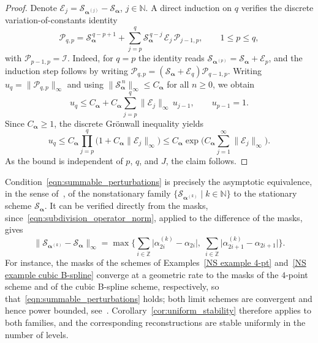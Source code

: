 \documentclass[11pt,a4paper]{article}
\newcommand{\N}{\mathbb{N}}
\theoremstyle{definition}
\begin{document}
\begin{proof}
    Denote $\mathcal{E}_j=\mathcal{S}_{\boldsymbol{\alpha}^{(j)}}-\mathcal{S}_{\boldsymbol{\alpha}}$, $j\in\N$. A direct induction on $q$ verifies the discrete variation-of-constants identity
    \begin{equation*}
        \mathcal{P}_{q,p}=\mathcal{S}_{\boldsymbol{\alpha}}^{\,q-p+1}+\sum_{j=p}^{q}\mathcal{S}_{\boldsymbol{\alpha}}^{\,q-j}\,\mathcal{E}_j\,\mathcal{P}_{j-1,p}, \qquad 1\leq p\leq q,
    \end{equation*}
    with $\mathcal{P}_{p-1,p}=\mathcal{I}$. Indeed, for $q=p$ the identity reads $\mathcal{S}_{\boldsymbol{\alpha}^{(p)}}=\mathcal{S}_{\boldsymbol{\alpha}}+\mathcal{E}_p$, and the induction step follows by writing $\mathcal{P}_{q,p}=(\mathcal{S}_{\boldsymbol{\alpha}}+\mathcal{E}_q)\mathcal{P}_{q-1,p}$. Writing $u_q=\|\mathcal{P}_{q,p}\|_\infty$ and using $\|\mathcal{S}_{\boldsymbol{\alpha}}^{\,n}\|_\infty\leq C_{\boldsymbol{\alpha}}$ for all $n\geq0$, we obtain
    \begin{equation*}
        u_q\leq C_{\boldsymbol{\alpha}}+C_{\boldsymbol{\alpha}}\sum_{j=p}^{q}\|\mathcal{E}_j\|_\infty\, u_{j-1}, \qquad u_{p-1}=1.
    \end{equation*}
    Since $C_{\boldsymbol{\alpha}}\geq1$, the discrete Gr\"onwall inequality yields
    \begin{equation*}
        u_q\leq C_{\boldsymbol{\alpha}}\prod_{j=p}^{q}\big(1+C_{\boldsymbol{\alpha}}\|\mathcal{E}_j\|_\infty\big)\leq C_{\boldsymbol{\alpha}}\exp\bigg(C_{\boldsymbol{\alpha}}\sum_{j=1}^{\infty}\|\mathcal{E}_j\|_\infty\bigg).
    \end{equation*}
    As the bound is independent of $p$, $q$, and $J$, the claim follows.
\end{proof}

Condition~\eqref{eqn:summable_perturbations} is precisely the asymptotic equivalence, in the sense of~\cite{dyn1995analysis}, of the nonstationary family $\{\mathcal{S}_{\boldsymbol{\alpha}^{(k)}} \mid k\in\N\}$ to the stationary scheme $\mathcal{S}_{\boldsymbol{\alpha}}$. It can be verified directly from the masks, since~\eqref{eqn:subdivision_operator_norm}, applied to the difference of the masks, gives
\begin{equation*}
    \big\|\mathcal{S}_{\boldsymbol{\alpha}^{(k)}}-\mathcal{S}_{\boldsymbol{\alpha}}\big\|_\infty=\max\bigg\{\sum_{i\in\mathbb{Z}}\big|\alpha^{(k)}_{2i}-\alpha_{2i}\big|,\; \sum_{i\in\mathbb{Z}}\big|\alpha^{(k)}_{2i+1}-\alpha_{2i+1}\big|\bigg\}.
\end{equation*}
For instance, the masks of the schemes of Examples~\ref{NS example 4-pt} and~\ref{NS example cubic B-spline} converge at a geometric rate to the masks of the $4$-point scheme and of the cubic B-spline scheme, respectively, so that~\eqref{eqn:summable_perturbations} holds; both limit schemes are convergent and hence power bounded, see~\cite{dyn2002subdivision}. Corollary~\ref{cor:uniform_stability} therefore applies to both families, and the corresponding reconstructions are stable uniformly in the number of levels.
\end{document}
